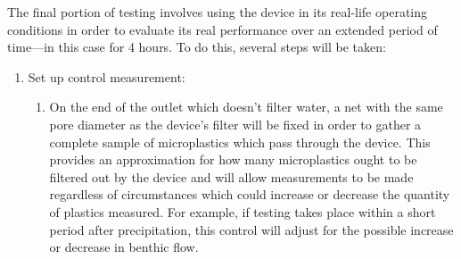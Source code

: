 \documentclass[fleqn,10pt]{SelfArx} %
\begin{document}
	The final portion of testing involves using the device in its real-life operating conditions in order to evaluate its real performance over an extended period of time—in this case for 4 hours. To do this, several steps will be taken: 
	\begin{enumerate}
		
		\item Set up control measurement:	
		\begin{enumerate}
			\item On the end of the outlet which doesn't filter water, a net with the same pore diameter as the device’s filter will be fixed in order to gather a complete sample of microplastics which pass through the device. This provides an approximation for how many microplastics ought to be filtered out by the device and will allow measurements to be made regardless of circumstances which could increase or decrease the quantity of plastics measured. For example, if testing takes place within a short period after precipitation, this control will adjust for the possible increase or decrease in \gls{benthic} flow.
		\end{enumerate}
		

\end{enumerate}
\end{document}
